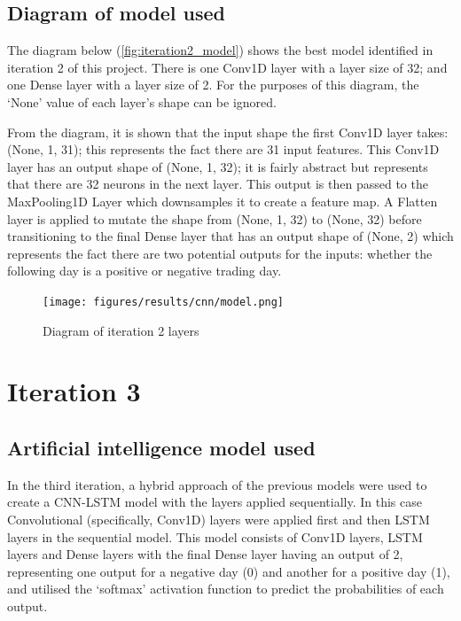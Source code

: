 \subsection{Diagram of model used}
The diagram below (\autoref{fig:iteration2_model}) shows the best model identified in iteration 2 of this project.
There is one Conv1D layer with a layer size of 32; and one Dense layer with a layer size of 2.
For the purposes of this diagram, the `None' value of each layer's shape can be ignored.

From the diagram, it is shown that the input shape the first Conv1D layer takes: (None, 1, 31); this represents the
fact there are 31 input features.  This Conv1D layer has an output shape of (None, 1, 32); it is fairly abstract
but represents that there are 32 neurons in the next layer. This output is then passed to the MaxPooling1D Layer
which downsamples it to create a feature map. A Flatten layer is applied to mutate the shape from (None, 1, 32) to
(None, 32) before transitioning to the final Dense layer that has an output shape of (None, 2)
which represents the fact there are two potential outputs for the inputs: whether the following day
is a positive or negative trading day.

\begin{figure}[ht]
    \centering
    \texttt{[image: figures/results/cnn/model.png]}
    \caption[Diagram of iteration 2 layers]{Diagram of iteration 2 layers}
    \label{fig:iteration2_model}
\end{figure}
\FloatBarrier

\section{Iteration 3}
\subsection{Artificial intelligence model used}\label{ssec:iteration3_ai_model}
In the third iteration, a hybrid approach of the previous models were used to create a CNN-LSTM model with the layers applied sequentially.
In this case Convolutional (specifically, Conv1D) layers were applied first and then LSTM layers in the sequential model.
This model consists of Conv1D layers, LSTM layers and Dense layers with the final Dense layer having an output of 2, representing one output for
a negative day (0) and another for a positive day (1), and utilised the `softmax' activation function to predict the
probabilities of each output.

